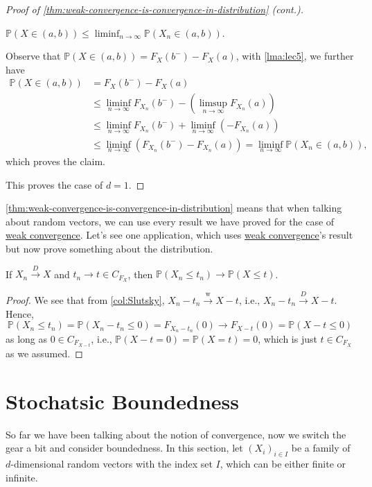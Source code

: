 \begin{proof}[Proof of \autoref{thm:weak-convergence-is-convergence-in-distribution} (cont.)]
	\begin{claim}
		\(\mathbb{P} (X \in (a, b)) \leq \liminf_{n \to \infty} \mathbb{P} (X_n \in (a, b))\).
	\end{claim}
	\begin{explanation}
		Observe that \(\mathbb{P} (X \in (a, b)) = F_X(b^-) - F_X(a)\), with \autoref{lma:lec5}, we further have
		\[
			\begin{split}
				\mathbb{P} (X \in (a, b))
				 & = F_X(b^-) - F_X(a)                                                                         \\
				 & \leq \liminf_{n \to \infty} F_{X_n}(b^-) - \left( \limsup_{n \to \infty} F_{X_n}(a) \right) \\
				 & \leq \liminf_{n \to \infty} F_{X_n}(b^-) + \liminf_{n \to \infty} (-F_{X_n}(a))             \\
				 & \leq \liminf_{n \to \infty} \left( F_{X_n}(b^-) - F_{X_n}(a) \right)
				= \liminf_{n \to \infty} \mathbb{P} (X_n \in (a, b)),
			\end{split}
		\]
		which proves the claim.
	\end{explanation}
	This proves the case of \(d = 1\).
\end{proof}

\autoref{thm:weak-convergence-is-convergence-in-distribution} means that when talking about random vectors, we can use every result we have proved for the case of \hyperref[def:converge-weakly]{weak convergence}. Let's see one application, which uses \hyperref[def:converge-weakly]{weak convergence}'s result but now prove something about the distribution.

\begin{proposition}
	If \(X_n \overset{D}{\to } X\) and \(t_n \to t \in C_{F_X}\), then \(\mathbb{P} (X_n \leq t_n) \to \mathbb{P} (X \leq t)\).
\end{proposition}
\begin{proof}
	We see that from \autoref{col:Slutsky}, \(X_n - t_n \overset{\text{w} }{\to } X - t\), i.e., \(X_n - t_n \overset{D}{\to } X - t\). Hence,
	\[
		\mathbb{P} (X_n \leq t_n)
		= \mathbb{P} (X_n - t_n \leq 0)
		= F_{X_n - t_n} (0)
		\to F_{X - t} (0)
		= \mathbb{P} (X - t \leq 0)
	\]
	as long as \(0 \in C_{F_{X - t}}\), i.e., \(\mathbb{P} (X - t = 0) = \mathbb{P} (X = t) = 0\), which is just \(t \in C_{F_X}\) as we assumed.
\end{proof}

\section{Stochatsic Boundedness}
So far we have been talking about the notion of convergence, now we switch the gear a bit and consider boundedness. In this section, let \((X_i)_{i \in I}\) be a family of \(d\)-dimensional random vectors with the index set \(I\), which can be either finite or infinite.

